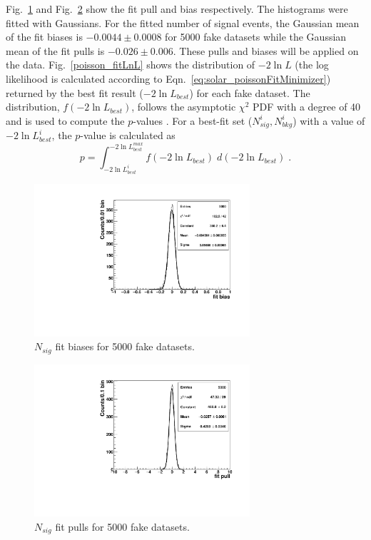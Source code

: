 Fig.~\ref{poisson_fitBias} and Fig.~\ref{poisson_fitPull} show the fit pull and bias respectively. The histograms were fitted with Gaussians. For the fitted number of signal events, the Gaussian mean of the fit biases is $-0.0044\pm0.0008$ for 5000 fake datasets while the Gaussian mean of the fit pulls is $-0.026\pm0.006$. These pulls and biases will be applied on the data. Fig.~\ref{poisson_fitLnL} shows the distribution of $-2\ln L$ (the log likelihood is calculated according to Eqn.~\ref{eq:solar_poissonFitMinimizer}) returned by the best fit result ($-2\ln L_{best}$) for each fake dataset. The distribution, $f({-2\ln L_{best}})$, follows the asymptotic $\chi^2$ PDF with a degree of 40 and is used to compute the $p$-values \cite{pdg2020}. For a best-fit set ($N^i_{sig},N^i_{bkg}$) with a value of $-2\ln L^i_{best}$, the $p$-value is calculated as
\begin{equation*}
p=\int_{-2\ln L^{i}_{best}}^{-2\ln L^{max}_{best}}f({-2\ln L_{best}}) \; d(-2\ln L_{best}) \; .
\end{equation*}


\begin{figure}[!htb]
	\centering
	\includegraphics[width=8cm]{ensemble_fitBias.pdf}
	\caption{$N_{sig}$ fit biases for 5000 fake datasets. \label{poisson_fitBias}}
\end{figure} 

\begin{figure}[!htb]
	\centering
	\includegraphics[width=8cm]{ensemble_fitPull.pdf}
	\caption{$N_{sig}$ fit pulls for 5000 fake datasets. \label{poisson_fitPull}}
\end{figure} 

